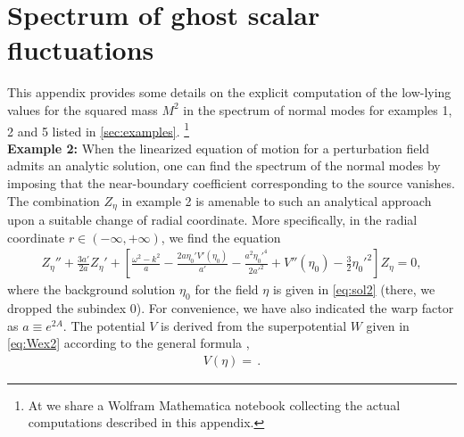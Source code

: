 \section{Spectrum of ghost scalar fluctuations}\label{app:numerics}

This appendix provides some details on the explicit computation of the low-lying values for the squared mass $M^2$ in the spectrum of normal modes for examples 1, 2 and 5 listed in \cref{sec:examples}.%
\footnote{
At \cite{code} we share a Wolfram Mathematica notebook collecting the actual computations described in this appendix.
}\\

\noindent 
\textbf{Example 2:}
When the linearized equation of motion for a perturbation field admits an analytic solution, one can find the spectrum of the normal modes by imposing that the near-boundary coefficient corresponding to the source vanishes.
The combination $Z_\eta$ in example 2 is amenable to such an analytical approach upon a suitable change of radial coordinate.
More specifically, in the radial coordinate $r\in\left(-\infty,+\infty\right)$, we find the equation 
\begin{align}
	Z_\eta''
	+
	\frac{3a'}{2a} Z_\eta'
	+
	\left[
	\frac{\omega^2-k^2}{a}
	-\frac{2a\eta_0' V'(\eta_0)}{a'}
	-\frac{a^2\eta_0'^4}{2 a'^2}
	+V''(\eta_0)
	-\frac{3}{2} \eta_0'^2\right]
	Z_\eta
	=     
	0,
\end{align}
where the background solution $\eta_0$ for the field $\eta$ is given in \cref{eq:sol2} (there, we dropped the subindex 0).
For convenience, we have also indicated the warp factor as $a\equiv e^{2A}$.
The potential $V$ is derived from the superpotential $W$ given in \cref{eq:Wex2} according to the general formula ,
\begin{eqnarray}
	V(\eta)
	=
	\,.
\end{eqnarray}

